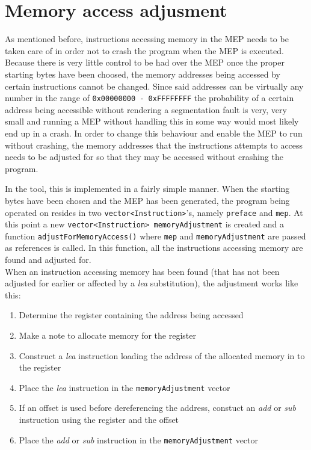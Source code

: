 \documentclass[11pt,twoside]{eitExjobb}
\begin{document}
\section{Memory access adjusment}
As mentioned before, instructions accessing memory in the MEP needs to be taken care of in order not to crash the program when the MEP is executed. Because there is very little control to be had over the MEP once the proper starting bytes have been choosed, the memory addresses being accessed by certain instructions cannot be changed. Since said addresses can be virtually any number in the range of \texttt{0x00000000 - 0xFFFFFFFF} the probability of a certain address being accessible without rendering a segmentation fault is very, very small and running a MEP without handling this in some way would most likely end up in a crash.  In order to change this behaviour and enable the MEP to run without crashing, the memory addresses that the instructions attempts to access needs to be adjusted for so that they may be accessed without crashing the program. 

In the tool, this is implemented in a fairly simple manner. When the starting bytes have been chosen and the MEP has been generated, the program being operated on resides in two \texttt{vector<Instruction>}'s, namely \texttt{preface} and \texttt{mep}. At this point a new \texttt{vector<Instruction> memoryAdjustment} is created and a function \texttt{adjustForMemoryAccess()} where \texttt{mep} and \texttt{memoryAdjustment} are passed as references is called. In this function, all the instructions accessing memory are found and adjusted for.\\

\noindent When an instruction accessing memory has been found (that has not been adjusted for earlier or affected by a \emph{lea} substitution), the adjustment works like this:
\begin{enumerate}
\item{Determine the register containing the address being accessed}
\item{Make a note to allocate memory for the register}
\item{Construct a \emph{lea} instruction loading the address of the allocated memory in to the register}
\item{Place the \emph{lea} instruction in the \texttt{memoryAdjustment} vector}
\item{If an offset is used before dereferencing the address, constuct an \emph{add} or \emph{sub} instruction using the register and the offset}
\item{Place the \emph{add} or \emph{sub} instruction in the \texttt{memoryAdjustment} vector}
\end{enumerate} 
\end{document}
